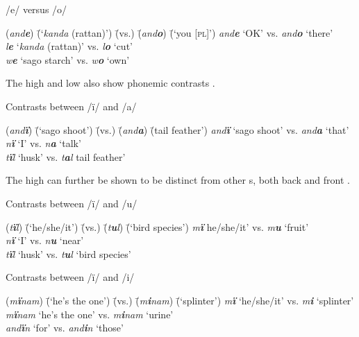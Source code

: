     \ex  /e/ versus /o/\\
\begin{tabbing}
{(\textit{and\textbf{e}})} \= {(‘\textit{kanda} (rattan)’)} \= {(vs.)} \= {(\textit{and\textbf{o}})} \= {(‘you [\textsc{pl}]’)}\kill
{\textit{and\textbf{e}}} \> {‘OK’} \> {vs.} \> {\textit{and\textbf{o}}} \> {‘there’}\\
{\textit{l\textbf{e}}} \> {‘\textit{kanda} (rattan)’} \> {vs.} \> {\textit{l\textbf{o}}} \> {‘cut’}\\
{\textit{w\textbf{e}}} \> {‘sago starch’} \> {vs.} \> {\textit{w\textbf{o}}} \> {‘own’}
\end{tabbing}
\z
\z

The high  and  low  also show phonemic contrasts .

\ea%
    \label{ex:phon:48}
          Contrasts between /ï/ and /a/\\
\begin{tabbing}
{(\textit{and\textbf{ï}})} \= {(‘sago shoot’)} \= {(vs.)} \= {(\textit{and\textbf{a}})} \= {(tail feather’)}\kill
{\textit{and\textbf{ï}}} \> {‘sago shoot’} \> {vs.} \> {\textit{and\textbf{a}}} \> {‘that’}\\
{\textit{n\textbf{ï}}} \> {‘I’} \> {vs.} \> {\textit{n\textbf{a}}} \> {‘talk’}\\
{\textit{t\textbf{ï}l}} \> {‘husk’} \> {vs.} \> {\textit{t\textbf{a}l}} \> {tail feather’}
\end{tabbing}
\z

The high  can further be shown to be distinct from other s, both back  and front .

\ea%
    \label{ex:phon:49}
          Contrasts between /ï/ and /u/\\
\begin{tabbing}
{(\textit{t\textbf{ï}l})} \= {(‘he/she/it’)} \= {(vs.)} \= {(\textit{t\textbf{u}l})} \= {(‘bird species’)}\kill
{\textit{m\textbf{ï}}} \> {he/she/it’} \> {vs.} \> {\textit{m\textbf{u}}} \> {‘fruit’}\\
{\textit{n\textbf{ï}}} \> {‘I’} \> {vs.} \> {\textit{n\textbf{u}}} \> {‘near’}\\
{\textit{t\textbf{ï}l}} \> {‘husk’} \> {vs.} \> {\textit{t\textbf{u}l}} \> {‘bird species’}
\end{tabbing}
\z

\ea%
    \label{ex:phon:50}
          Contrasts between /ï/ and /i/\\
\begin{tabbing}
{(\textit{m\textbf{ï}nam})} \= {(‘he’s the one’)} \= {(vs.)} \= {(\textit{m\textbf{i}nam})} \= {(‘splinter’)}\kill
{\textit{m\textbf{ï}}} \> {‘he/she/it’} \> {vs.} \> {\textit{m\textbf{i}}} \> {‘splinter’}\\
{\textit{m\textbf{ï}nam}} \> {‘he’s the one’} \> {vs.} \> {\textit{m\textbf{i}nam}} \> {‘urine’}\\
{\textit{and\textbf{ï}n}} \> {‘for’} \> {vs.} \> {\textit{and\textbf{i}n}} \> {‘those’}
\end{tabbing}
\z

